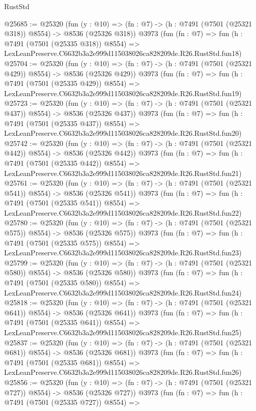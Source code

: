 \begin{lexlean}{RustStd}
\begin{coremodule}
@25685 := @25320
    (fun (y : @10) => (fn : @7) -> (h : @7491 (@7501 (@25321 @318)) @8554) -> @8536 (@25326 @318))
    @3973
    (fun (fn : @7) =>
    fun (h : @7491 (@7501 (@25335 @318)) @8554) =>
    LexLeanPreserve.C6632b3a2e999d115038026ca828209de.R26.RustStd.fun18)
@25704 := @25320
    (fun (y : @10) => (fn : @7) -> (h : @7491 (@7501 (@25321 @429)) @8554) -> @8536 (@25326 @429))
    @3973
    (fun (fn : @7) =>
    fun (h : @7491 (@7501 (@25335 @429)) @8554) =>
    LexLeanPreserve.C6632b3a2e999d115038026ca828209de.R26.RustStd.fun19)
@25723 := @25320
    (fun (y : @10) => (fn : @7) -> (h : @7491 (@7501 (@25321 @437)) @8554) -> @8536 (@25326 @437))
    @3973
    (fun (fn : @7) =>
    fun (h : @7491 (@7501 (@25335 @437)) @8554) =>
    LexLeanPreserve.C6632b3a2e999d115038026ca828209de.R26.RustStd.fun20)
@25742 := @25320
    (fun (y : @10) => (fn : @7) -> (h : @7491 (@7501 (@25321 @442)) @8554) -> @8536 (@25326 @442))
    @3973
    (fun (fn : @7) =>
    fun (h : @7491 (@7501 (@25335 @442)) @8554) =>
    LexLeanPreserve.C6632b3a2e999d115038026ca828209de.R26.RustStd.fun21)
@25761 := @25320
    (fun (y : @10) => (fn : @7) -> (h : @7491 (@7501 (@25321 @541)) @8554) -> @8536 (@25326 @541))
    @3973
    (fun (fn : @7) =>
    fun (h : @7491 (@7501 (@25335 @541)) @8554) =>
    LexLeanPreserve.C6632b3a2e999d115038026ca828209de.R26.RustStd.fun22)
@25780 := @25320
    (fun (y : @10) => (fn : @7) -> (h : @7491 (@7501 (@25321 @575)) @8554) -> @8536 (@25326 @575))
    @3973
    (fun (fn : @7) =>
    fun (h : @7491 (@7501 (@25335 @575)) @8554) =>
    LexLeanPreserve.C6632b3a2e999d115038026ca828209de.R26.RustStd.fun23)
@25799 := @25320
    (fun (y : @10) => (fn : @7) -> (h : @7491 (@7501 (@25321 @580)) @8554) -> @8536 (@25326 @580))
    @3973
    (fun (fn : @7) =>
    fun (h : @7491 (@7501 (@25335 @580)) @8554) =>
    LexLeanPreserve.C6632b3a2e999d115038026ca828209de.R26.RustStd.fun24)
@25818 := @25320
    (fun (y : @10) => (fn : @7) -> (h : @7491 (@7501 (@25321 @641)) @8554) -> @8536 (@25326 @641))
    @3973
    (fun (fn : @7) =>
    fun (h : @7491 (@7501 (@25335 @641)) @8554) =>
    LexLeanPreserve.C6632b3a2e999d115038026ca828209de.R26.RustStd.fun25)
@25837 := @25320
    (fun (y : @10) => (fn : @7) -> (h : @7491 (@7501 (@25321 @681)) @8554) -> @8536 (@25326 @681))
    @3973
    (fun (fn : @7) =>
    fun (h : @7491 (@7501 (@25335 @681)) @8554) =>
    LexLeanPreserve.C6632b3a2e999d115038026ca828209de.R26.RustStd.fun26)
@25856 := @25320
    (fun (y : @10) => (fn : @7) -> (h : @7491 (@7501 (@25321 @727)) @8554) -> @8536 (@25326 @727))
    @3973
    (fun (fn : @7) =>
    fun (h : @7491 (@7501 (@25335 @727)) @8554) =>

\end{coremodule}
\end{lexlean}
